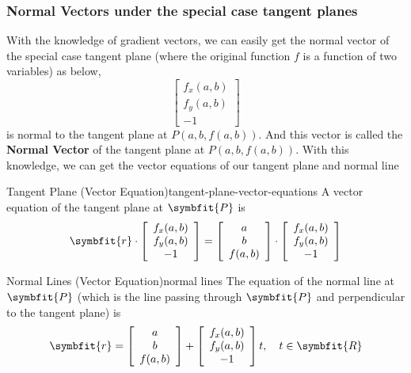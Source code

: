 \documentclass[math,code]{amznotes}
\theoremstyle{remark}
\begin{document}
\subsubsection{Normal Vectors under the special case tangent planes}
With the knowledge of gradient vectors, we can easily get the normal vector of the special case tangent plane (where the original function $f$ is a function of two variables) as below,
\begin{displaymath}
    \left[\begin{array}{c}
        f_x(a,b) \\
        f_y(a,b) \\
        -1
    \end{array}\right]
\end{displaymath}
is normal to the tangent plane at $P(a,b,f(a,b))$. And this vector is called the {\color{red} \textbf{Normal Vector}} of the tangent plane at $P(a,b,f(a,b))$. With this knowledge, we can get the vector equations of our tangent plane and normal line
\begin{thmbox}{Tangent Plane (Vector Equation)}{tangent-plane-vector-equations}
    A vector equation of the tangent plane at $\symbfit{P}$ is
    \begin{displaymath}
        \symbfit{r} \cdot \left[\begin{array}{c}
             f_x(a,b) \\
             f_y(a,b) \\
             -1
        \end{array}\right]
        =
        \left[\begin{array}{c}
             a \\
             b \\
             f(a,b)
        \end{array}\right]
        \cdot
        \left[\begin{array}{c}
             f_x(a,b) \\
             f_y(a,b) \\
             -1
        \end{array}\right]
    \end{displaymath}
\end{thmbox}
\begin{thmbox}{Normal Lines (Vector Equation)}{normal lines}
    The equation of the normal line at $\symbfit{P}$ (which is the line passing through $\symbfit{P}$ and perpendicular to the tangent plane) is
    \begin{displaymath}
        \symbfit{r} =
        \left[\begin{array}{c}
             a \\
             b \\
             f(a,b)
        \end{array}\right]
        +
        \left[\begin{array}{c}
             f_x(a,b) \\
             f_y(a,b) \\
             -1
        \end{array}\right]
        t, ~~~t \in \symbfit{R}
    \end{displaymath}
\end{thmbox}
\end{document}
